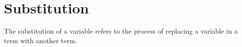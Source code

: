 \documentclass{lecturenotes}
\begin{document}
\begin{code}
\>[0]\AgdaSymbol{(}\AgdaSpace{}%
\AgdaSymbol{)}\AgdaSpace{}%
\AgdaSpace{}%
\AgdaSpace{}%
\AgdaSpace{}%
\AgdaSymbol{=}\AgdaSpace{}%
\AgdaSpace{}%
\AgdaSymbol{(}\AgdaSpace{}%
\AgdaSpace{}%
\AgdaSpace{}%
\AgdaSpace{}%
\AgdaSymbol{)}\<%
\\
\>[0]\AgdaSymbol{(}\AgdaSpace{}%
\AgdaSpace{}%
\AgdaSymbol{)}\AgdaSpace{}%
\AgdaSpace{}%
\AgdaSpace{}%
\AgdaSpace{}%
\AgdaSymbol{=}\AgdaSpace{}%
\AgdaSymbol{(}\AgdaSpace{}%
\AgdaSpace{}%
\AgdaSpace{}%
\AgdaSymbol{)}\AgdaSpace{}%
\AgdaSpace{}%
\AgdaSymbol{(}\AgdaSpace{}%
\AgdaSpace{}%
\AgdaSpace{}%
\AgdaSymbol{)}\<%
\\
\>[0]\<%
\end{code}


\section{Substitution}

The substitution of a variable refers to the process of replacing a variable in a term with another term.
\end{document}
